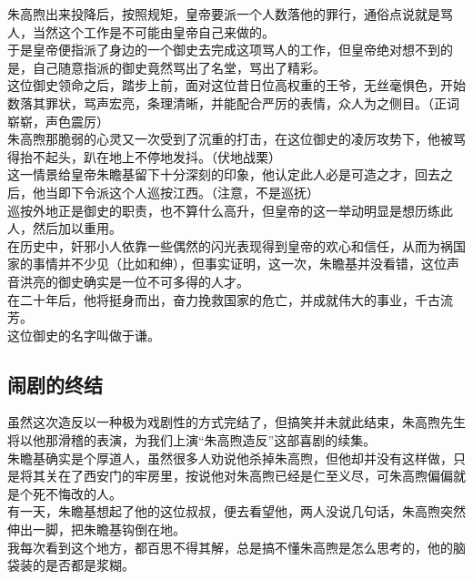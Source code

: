 \begin{multicols}{\theparacolNo}
朱高煦出来投降后，按照规矩，皇帝要派一个人数落他的罪行，通俗点说就是骂人，当然这个工作是不可能由皇帝自己来做的。\\

于是皇帝便指派了身边的一个御史去完成这项骂人的工作，但皇帝绝对想不到的是，自己随意指派的御史竟然骂出了名堂，骂出了精彩。\\

这位御史领命之后，踏步上前，面对这位昔日位高权重的王爷，无丝毫惧色，开始数落其罪状，骂声宏亮，条理清晰，并能配合严厉的表情，众人为之侧目。（正词崭崭，声色震厉）\\

朱高煦那脆弱的心灵又一次受到了沉重的打击，在这位御史的凌厉攻势下，他被骂得抬不起头，趴在地上不停地发抖。（伏地战栗）\\

这一情景给皇帝朱瞻基留下十分深刻的印象，他认定此人必是可造之才，回去之后，他当即下令派这个人巡按江西。（注意，不是巡抚）\\

巡按外地正是御史的职责，也不算什么高升，但皇帝的这一举动明显是想历练此人，然后加以重用。\\

在历史中，奸邪小人依靠一些偶然的闪光表现得到皇帝的欢心和信任，从而为祸国家的事情并不少见（比如和绅），但事实证明，这一次，朱瞻基并没看错，这位声音洪亮的御史确实是一位不可多得的人才。\\

在二十年后，他将挺身而出，奋力挽救国家的危亡，并成就伟大的事业，千古流芳。\\

这位御史的名字叫做于谦。\\

\subsection{闹剧的终结}
虽然这次造反以一种极为戏剧性的方式完结了，但搞笑并未就此结束，朱高煦先生将以他那滑稽的表演，为我们上演“朱高煦造反”这部喜剧的续集。\\

朱瞻基确实是个厚道人，虽然很多人劝说他杀掉朱高煦，但他却并没有这样做，只是将其关在了西安门的牢房里，按说他对朱高煦已经是仁至义尽，可朱高煦偏偏就是个死不悔改的人。\\

有一天，朱瞻基想起了他的这位叔叔，便去看望他，两人没说几句话，朱高煦突然伸出一脚，把朱瞻基钩倒在地。\\

我每次看到这个地方，都百思不得其解，总是搞不懂朱高煦是怎么思考的，他的脑袋装的是否都是浆糊。\\


\end{multicols}
